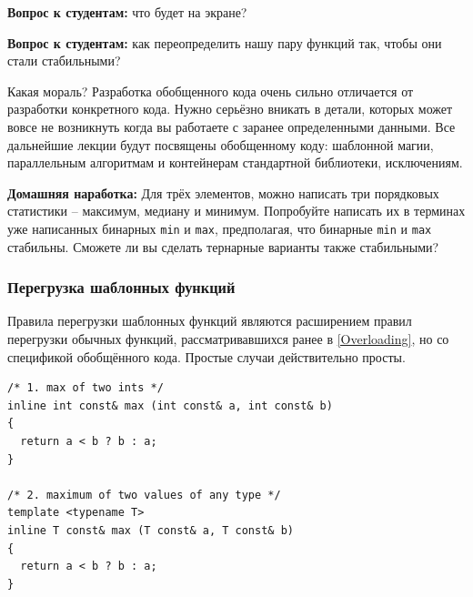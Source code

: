 \documentclass[a4paper,12pt,oneside]{article}
\newif\ifanswers
\begin{document}
\textbf{Вопрос к студентам:} что будет на экране?

\ifanswers
Неожиданно на экране будет 1 и 0. Такое поведение функций, когда для пары одинаковых объектов они сохраняют их значения и порядок в результирующей паре, называется стабильностью. Можно сделать вывод, что функции \lstinline!min! и \lstinline!max! ведут себя \textbf{нестабильно}. Проблемы стабильности также возникают при проектировании обобщённых алгоритмов сортировки, бинарного поиска и многих других.
\fi

\textbf{Вопрос к студентам:} как переопределить нашу пару функций так, чтобы они стали стабильными?

\ifanswers
Один из вариантов решения

\begin{lstlisting}
template <class T> const T&
max (const T &x, const T &y)
{
  return ((x > y) ? x : y);
}

template <class T> const T&
min (const T &x, const T &y)
{
  return ((x <= y) ? x : y);
}
\end{lstlisting}
\fi

Какая мораль? Разработка обобщенного кода очень сильно отличается от разработки конкретного кода. Нужно серьёзно вникать в детали, которых может вовсе не возникнуть когда вы работаете с заранее определенными данными. Все дальнейшие лекции будут посвящены обобщенному коду: шаблонной магии, параллельным алгоритмам и контейнерам стандартной библиотеки, исключениям. 

\textbf{Домашняя наработка:} Для трёх элементов, можно написать три порядковых статистики -- максимум, медиану и минимум. Попробуйте написать их в терминах уже написанных бинарных \lstinline!min! и \lstinline!max!, предполагая, что бинарные \lstinline!min! и \lstinline!max! стабильны. Сможете ли вы сделать тернарные варианты также стабильными?

\subsubsection{Перегрузка шаблонных функций}\label{TemplOverloading}

Правила перегрузки шаблонных функций являются расширением правил перегрузки обычных функций, рассматривавшихся ранее в \ref{Overloading}, но со спецификой обобщённого кода. Простые случаи действительно просты. 

\begin{lstlisting}
/* 1. max of two ints */
inline int const& max (int const& a, int const& b)
{
  return a < b ? b : a;
}

/* 2. maximum of two values of any type */
template <typename T>
inline T const& max (T const& a, T const& b)
{
  return a < b ? b : a;
}
\end{lstlisting}
\end{document}
